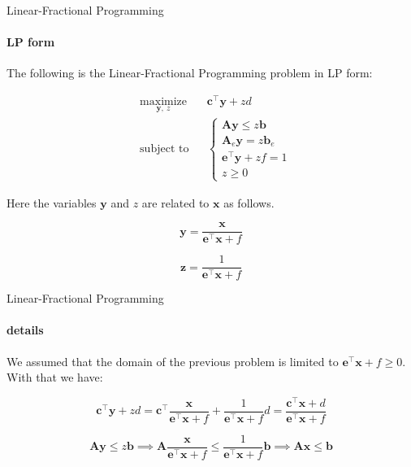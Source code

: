 \documentclass{beamer}
\begin{document}
\begin{frame}{Linear-Fractional Programming}
	\framesubtitle{LP form}
	\begin{flushleft}
		
		The following is the Linear-Fractional Programming problem in LP form:
		
		\begin{equation}
			\begin{aligned}
				& \underset{\mathbf{y}, \ z}{\text{maximize}}
				& & \mathbf{c}^\top \mathbf{y} + z d \\
				& \text{subject to}
				& & 
				\begin{cases}
					\mathbf{A} \mathbf{y} \leq z \mathbf{b} \\
					\mathbf{A}_e \mathbf{y} = z \mathbf{b}_e \\
					\mathbf{e}^\top \mathbf{y} + z f = 1 \\
					z \geq 0
				\end{cases}
			\end{aligned}
		\end{equation}
		
		Here the variables $\mathbf{y}$ and $z$ are related to $\mathbf{x}$ as follows.
		
		\begin{equation}
			\mathbf{y} = \frac{\mathbf{x}}{\mathbf{e}^\top \mathbf{x} + f}
		\end{equation}
	 
	\begin{equation}
	\mathbf{z} = \frac{1}{\mathbf{e}^\top \mathbf{x} + f}
	\end{equation} 
		
	\end{flushleft}
\end{frame}



\begin{frame}{Linear-Fractional Programming}
	\framesubtitle{details}
	\begin{flushleft}
		
		We assumed that the domain of the previous problem is limited to $\mathbf{e}^\top \mathbf{x} + f \geq 0$. With that we have:
		
		\begin{equation}
			 \mathbf{c}^\top \mathbf{y} + z d 
			 = 
			 \mathbf{c}^\top\frac{\mathbf{x}}{\mathbf{e}^\top \mathbf{x} + f} + \frac{1}{\mathbf{e}^\top \mathbf{x} + f} d 
			 =
			 \frac{\mathbf{c}^\top\mathbf{x} + d}{\mathbf{e}^\top \mathbf{x} + f}
		\end{equation}
		
		
		\begin{equation}
			\mathbf{A} \mathbf{y} \leq z \mathbf{b} 
			\implies
			\mathbf{A} \frac{\mathbf{x}}{\mathbf{e}^\top \mathbf{x} + f} \leq \frac{1}{\mathbf{e}^\top \mathbf{x} + f} \mathbf{b} 
			\implies
			\mathbf{A} \mathbf{x} \leq \mathbf{b} 
		\end{equation}
		
		
	\end{flushleft}
\end{frame}
\end{document}
